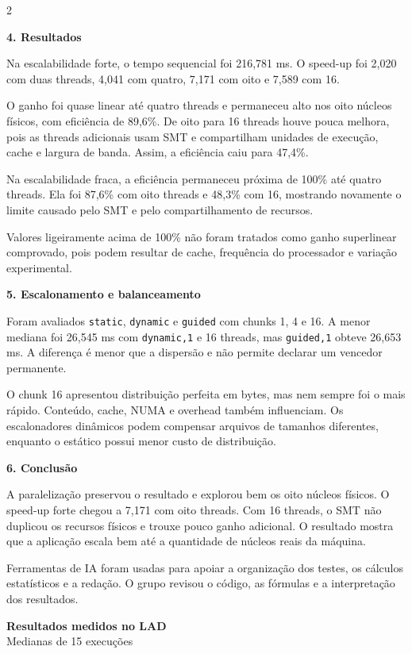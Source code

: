 \documentclass[10pt,a4paper]{article}
\newcommand{\secao}[1]{\vspace{2pt}\textbf{\large #1}\par}
\begin{document}
\begin{multicols}{2}
\columnbreak

\secao{4. Resultados}

Na escalabilidade forte, o tempo sequencial foi 216,781 ms. O speed-up foi
2,020 com duas threads, 4,041 com quatro, 7,171 com oito e 7,589 com 16.

O ganho foi quase linear até quatro threads e permaneceu alto nos oito núcleos
físicos, com eficiência de 89,6\%. De oito para 16 threads houve pouca melhora,
pois as threads adicionais usam SMT e compartilham unidades de execução, cache
e largura de banda. Assim, a eficiência caiu para 47,4\%.

Na escalabilidade fraca, a eficiência permaneceu próxima de 100\% até quatro
threads. Ela foi 87,6\% com oito threads e 48,3\% com 16, mostrando novamente o
limite causado pelo SMT e pelo compartilhamento de recursos.

Valores ligeiramente acima de 100\% não foram tratados como ganho superlinear
comprovado, pois podem resultar de cache, frequência do processador e variação
experimental.

\secao{5. Escalonamento e balanceamento}

Foram avaliados \texttt{static}, \texttt{dynamic} e \texttt{guided} com chunks
1, 4 e 16. A menor mediana foi 26,545 ms com \texttt{dynamic,1} e 16 threads,
mas \texttt{guided,1} obteve 26,653 ms. A diferença é menor que a dispersão e
não permite declarar um vencedor permanente.

O chunk 16 apresentou distribuição perfeita em bytes, mas nem sempre foi o
mais rápido. Conteúdo, cache, NUMA e overhead também influenciam. Os
escalonadores dinâmicos podem compensar arquivos de tamanhos diferentes,
enquanto o estático possui menor custo de distribuição.

\secao{6. Conclusão}

A paralelização preservou o resultado e explorou bem os oito núcleos físicos.
O speed-up forte chegou a 7,171 com oito threads. Com 16 threads, o SMT não
duplicou os recursos físicos e trouxe pouco ganho adicional. O resultado mostra
que a aplicação escala bem até a quantidade de núcleos reais da máquina.

Ferramentas de IA foram usadas para apoiar a organização dos testes, os
cálculos estatísticos e a redação. O grupo revisou o código, as fórmulas e a
interpretação dos resultados.

\end{multicols}

\clearpage
\begin{center}
  {\Large\textbf{Resultados medidos no LAD}}\\
  Medianas de 15 execuções
\end{center}
\end{document}
